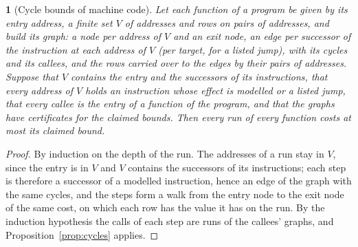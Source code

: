 \documentclass[oneside,english]{amsart}
\numberwithin{equation}{section}
\theoremstyle{plain}
\newtheorem{thm}{\protect\theoremname}
\theoremstyle{definition}
\theoremstyle{plain}
\theoremstyle{plain}
\theoremstyle{remark}
\providecommand{\theoremname}{Theorem}
\begin{document}
\begin{thm}[Cycle bounds of machine code]
\label{thm:machine-cycles}
Let each function of a program be given by its entry address, a finite set $V$ of addresses and rows on pairs of addresses, and build its graph: a node per address of $V$ and an exit node, an edge per successor of the instruction at each address of $V$ (per target, for a listed jump), with its cycles and its callees, and the rows carried over to the edges by their pairs of addresses. Suppose that $V$ contains the entry and the successors of its instructions, that every address of $V$ holds an instruction whose effect is modelled or a listed jump, that every callee is the entry of a function of the program, and that the graphs have certificates for the claimed bounds. Then every run of every function costs at most its claimed bound.
\end{thm}

\begin{proof}
By induction on the depth of the run. The addresses of a run stay in $V$, since the entry is in $V$ and $V$ contains the successors of its instructions; each step is therefore a successor of a modelled instruction, hence an edge of the graph with the same cycles, and the steps form a walk from the entry node to the exit node of the same cost, on which each row has the value it has on the run. By the induction hypothesis the calls of each step are runs of the callees' graphs, and Proposition~\ref{prop:cycles} applies.
\end{proof}
\end{document}
